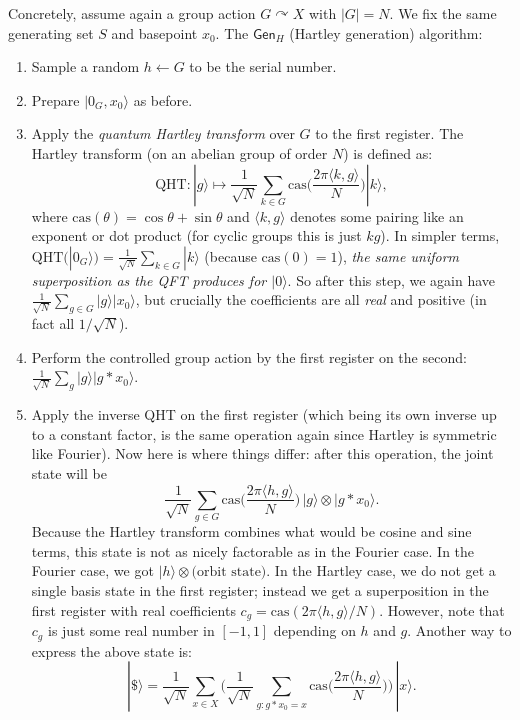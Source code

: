 \documentclass[12pt]{report}
\newcommand{\cas}{\mathrm{cas}}
\begin{document}
Concretely, assume again a group action $G \curvearrowright X$ with $|G|=N$. We fix the same generating set $S$ and basepoint $x_0$. The $\mathsf{Gen}_{H}$ (Hartley generation) algorithm:
\begin{enumerate}
    \item Sample a random $h \leftarrow G$ to be the serial number.
    \item Prepare $|0_G, x_0\rangle$ as before.
    \item Apply the \emph{quantum Hartley transform} over $G$ to the first register. The Hartley transform (on an abelian group of order $N$) is defined as:
    \[
       \mathrm{QHT}: |g\rangle \mapsto \frac{1}{\sqrt{N}} \sum_{k \in G} \cas \!\Big(\frac{2\pi \langle k,g \rangle}{N}\Big) |k\rangle,
    \] 
    where $\mathrm{cas}(\theta) = \cos \theta + \sin \theta$ and $\langle k,g \rangle$ denotes some pairing like an exponent or dot product (for cyclic groups this is just $kg$). In simpler terms, $\mathrm{QHT}(|0_G\rangle) = \frac{1}{\sqrt{N}}\sum_{k \in G} |k\rangle$ (because $\cas(0)=1$), \emph{the same uniform superposition as the QFT produces for $|0\rangle$}. So after this step, we again have $\frac{1}{\sqrt{N}}\sum_{g \in G} |g\rangle|x_0\rangle$, but crucially the coefficients are all \emph{real} and positive (in fact all $1/\sqrt{N}$).
    \item Perform the controlled group action by the first register on the second: $\frac{1}{\sqrt{N}}\sum_{g} |g\rangle |g*x_0\rangle$.
    \item Apply the inverse QHT on the first register (which being its own inverse up to a constant factor, is the same operation again since Hartley is symmetric like Fourier). Now here is where things differ: after this operation, the joint state will be 
    \[
       \frac{1}{\sqrt{N}} \sum_{g \in G} \cas\!\Big(\frac{2\pi \langle h,g \rangle}{N}\Big)\, |g\rangle \otimes |g*x_0\rangle.
    \] 
    Because the Hartley transform combines what would be cosine and sine terms, this state is not as nicely factorable as in the Fourier case. In the Fourier case, we got $|h\rangle \otimes \text{(orbit state)}$. In the Hartley case, we do not get a single basis state in the first register; instead we get a superposition in the first register with real coefficients $c_g = \cas(2\pi\langle h,g\rangle/N)$. However, note that $c_g$ is just some real number in $[-1,1]$ depending on $h$ and $g$. Another way to express the above state is:
    \[
      |\$\rangle = \frac{1}{\sqrt{N}} \sum_{x \in X} \Big(\frac{1}{\sqrt{N}}\sum_{g: g*x_0 = x} \cas\!\big(\frac{2\pi \langle h,g \rangle}{N}\big)\Big)\, |x\rangle.
\]
\end{enumerate}
\end{document}
